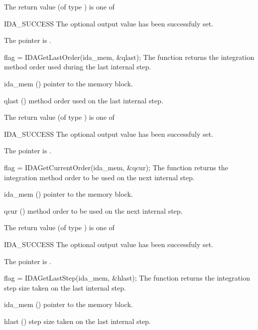 {
  The return value  (of type ) is one of
  \begin{args}
  \item[IDA\_SUCCESS] 
    The optional output value has been successfuly set.
  \item[\Id{IDA\_MEM\_NULL}]
    The  pointer is .
  \end{args}
}
{}
{
  flag = IDAGetLastOrder(ida\_mem, \&qlast);
}
{
  The function  returns the
  integration method order used during the last internal step.
}
{
  \begin{args}
  \item[ida\_mem] ()
    pointer to the {\ida} memory block.
  \item[qlast] ()
    method order used on the last internal step.
  \end{args}
}
{
  The return value  (of type ) is one of
  \begin{args}
  \item[IDA\_SUCCESS] 
    The optional output value has been successfuly set.
  \item[\Id{IDA\_MEM\_NULL}]
    The  pointer is .
  \end{args}
}
{}
{
  flag = IDAGetCurrentOrder(ida\_mem, \&qcur);
}
{
  The function  returns the
  integration method order to be used on the next internal step.
}
{
  \begin{args}
  \item[ida\_mem] ()
    pointer to the {\ida} memory block.
  \item[qcur] ()
    method order to be used on the next internal step.
  \end{args}
}
{
  The return value  (of type ) is one of
  \begin{args}
  \item[IDA\_SUCCESS] 
    The optional output value has been successfuly set.
  \item[\Id{IDA\_MEM\_NULL}]
    The  pointer is .
  \end{args}
}
{}
{
  flag = IDAGetLastStep(ida\_mem, \&hlast);
}
{
  The function  returns the
  integration step size taken on the last internal step.
}
{
  \begin{args}
  \item[ida\_mem] ()
    pointer to the {\ida} memory block.
  \item[hlast] ()
    step size taken on the last internal step.
  \end{args}
}
